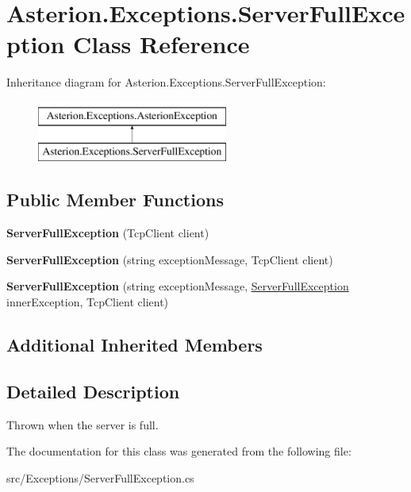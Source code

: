 \hypertarget{classAsterion_1_1Exceptions_1_1ServerFullException}{\section{Asterion.\-Exceptions.\-Server\-Full\-Exception Class Reference}
\label{classAsterion_1_1Exceptions_1_1ServerFullException}
}
Inheritance diagram for Asterion.\-Exceptions.\-Server\-Full\-Exception\-:\begin{figure}[H]
\begin{center}
\leavevmode
\includegraphics[height=2.000000cm]{classAsterion_1_1Exceptions_1_1ServerFullException}
\end{center}
\end{figure}
\subsection*{Public Member Functions}
\begin{DoxyCompactItemize}
\item 
\hypertarget{classAsterion_1_1Exceptions_1_1ServerFullException_a0c72e94485d8b3e820f73a04c14887d3}{{\bfseries Server\-Full\-Exception} (Tcp\-Client client)}\label{classAsterion_1_1Exceptions_1_1ServerFullException_a0c72e94485d8b3e820f73a04c14887d3}

\item 
\hypertarget{classAsterion_1_1Exceptions_1_1ServerFullException_a3f99e1f963856b148fb697ca5f4fc054}{{\bfseries Server\-Full\-Exception} (string exception\-Message, Tcp\-Client client)}\label{classAsterion_1_1Exceptions_1_1ServerFullException_a3f99e1f963856b148fb697ca5f4fc054}

\item 
\hypertarget{classAsterion_1_1Exceptions_1_1ServerFullException_ac528584371fabf11c2b358626e0a036b}{{\bfseries Server\-Full\-Exception} (string exception\-Message, \hyperlink{classAsterion_1_1Exceptions_1_1ServerFullException}{Server\-Full\-Exception} inner\-Exception, Tcp\-Client client)}\label{classAsterion_1_1Exceptions_1_1ServerFullException_ac528584371fabf11c2b358626e0a036b}

\end{DoxyCompactItemize}
\subsection*{Additional Inherited Members}


\subsection{Detailed Description}
Thrown when the server is full. 

The documentation for this class was generated from the following file\-:\begin{DoxyCompactItemize}
\item 
src/\-Exceptions/Server\-Full\-Exception.\-cs\end{DoxyCompactItemize}
